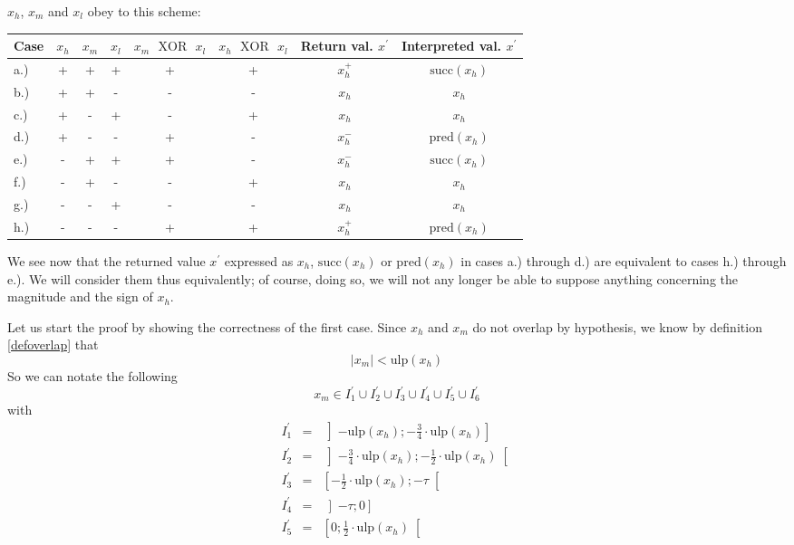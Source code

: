 \documentclass[a4paper,10pt,twoside]{article}
\newenvironment{proof}[1][Proof]{\begin{trivlist}
\item[\hskip \labelsep {\bfseries #1}]}{\end{trivlist}}
\newcommand{\hi}{\ensuremath{\mathit{h}}}
\newcommand{\mi}{\ensuremath{\mathit{m}}}
\newcommand{\lo}{\ensuremath{\mathit{l}}}
\newcommand{\mUlp}{\ensuremath{\mathrm{ulp}}}
\renewcommand{\succ}{\ensuremath{\mathrm{succ}}}
\newcommand{\pred}{\ensuremath{\mathrm{pred}}}
\newcommand{\xor}{\ensuremath{\mbox{ }\mathrm{XOR}\mbox{ }}}
\begin{document}
\begin{proof}
\begin{enumerate}
$x_\hi$, $x_\mi$ and $x_\lo$ obey to this scheme:
\begin{center}
\begin{tabular}{l|ccc|cc|c|c}
Case & $x_\hi$ & $x_\mi$ & $x_\lo$ & $x_\mi \xor x_\lo$ & $x_\hi \xor x_\lo$ &
Return val. $x^\prime$ & Interpreted val. $x^\prime$ \\
\hline
a.) & + & + & + & + & + & $x_\hi^+$ & $\succ\left( x_\hi \right)$ \\
b.) & + & + & - & - & - & $x_\hi$ & $x_\hi$ \\
c.) & + & - & + & - & + & $x_\hi$ & $x_\hi$ \\
d.) & + & - & - & + & - & $x_\hi^-$ & $\pred\left( x_\hi \right)$ \\
e.) & - & + & + & + & - & $x_\hi^-$ & $\succ\left( x_\hi \right)$ \\
f.) & - & + & - & - & + & $x_\hi$ & $x_\hi$ \\
g.) & - & - & + & - & - & $x_\hi$ & $x_\hi$ \\
h.) & - & - & - & + & + & $x_\hi^+$ & $\pred\left( x_\hi \right)$
\end{tabular}
\end{center}
We see now that the returned value $x^\prime$ expressed as $x_\hi$, $\succ\left(x_\hi\right)$ or $\pred\left(x_\hi\right)$ in
cases a.) through d.) are equivalent to cases h.) through e.).
We will consider them thus equivalently; of course, doing so, we will not any longer be able to suppose anything
concerning the magnitude and the sign of $x_\hi$.
\end{enumerate}
Let us start the proof by showing the correctness of the first case.
Since $x_\hi$ and $x_\mi$ do not overlap by hypothesis, we know by definition \ref{defoverlap} that
$$\left \vert x_\mi \right \vert < \mUlp\left( x_\hi \right)$$
So we can notate the following
$$x_\mi \in I^\prime_1 \cup I^\prime_2 \cup I^\prime_3 \cup I^\prime_4 \cup I^\prime_5 \cup I^\prime_6$$
with
\begin{eqnarray*}
I^\prime_1 & = & \left] - \mUlp\left( x_\hi \right) ; -\frac{3}{4} \cdot \mUlp\left(x_\hi \right) \right] \\
I^\prime_2 & = & \left] -\frac{3}{4} \cdot \mUlp\left(x_\hi \right) ;
- \frac{1}{2} \cdot \mUlp\left(x_\hi \right) \right[ \\
I^\prime_3 & = & \left[ - \frac{1}{2} \cdot \mUlp\left(x_\hi \right); -\tau \right[ \\
I^\prime_4 & = & \left] -\tau ; 0 \right] \\
I^\prime_5 & = & \left[ 0; \frac{1}{2} \cdot \mUlp\left(x_\hi\right) \right[ \\

\end{eqnarray*}
\end{proof}
\end{document}
